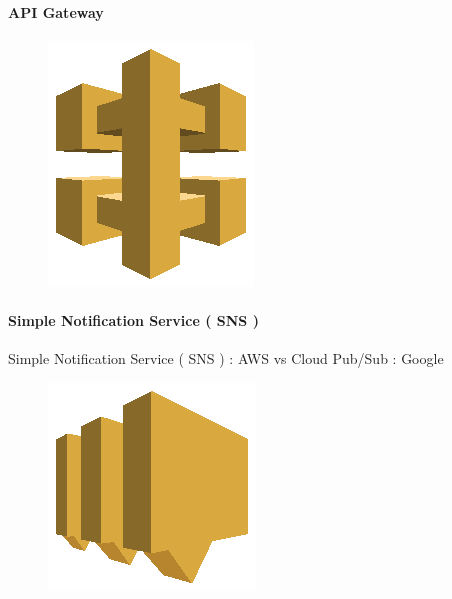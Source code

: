 \documentclass[
12pt,
english,
ngerman,
headsepline,
twoside,
openright,
numbers=noenddot,version=first
]{scrreprt}
\begin{document}
\paragraph{API Gateway}
\begin{figure}
	\includegraphics[width=0.9\linewidth]{./pics/aws/MobileServices_AmazonAPIGateway.eps}
\end{figure}

\paragraph{Simple Notification Service ( SNS )}
Simple Notification Service ( SNS ) : AWS vs Cloud Pub/Sub : Google
\begin{figure}
	\includegraphics[width=0.9\linewidth]{./pics/aws/Messaging_AmazonSNS.eps}
\end{figure}
\end{document}
